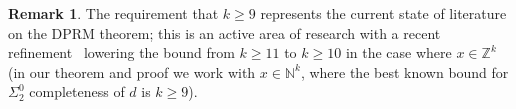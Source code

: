 \documentclass[10pt, a4paper, reqno]{amsart}
\numberwithin{equation}{section}
\renewcommand{\geq}{\geqslant}
\theoremstyle{definition}
\newtheorem{remark}[theorem]{Remark}
\theoremstyle{definition}
\begin{document}
 \begin{remark}
	The requirement that $k \geq 9$ represents the current state of literature on the DPRM theorem; this is an active area of research with a recent refinement~\cite{sun2026} lowering the bound from $k\geq11$ to $k\geq10$ in the case where $x \in \mathbb{Z}^k$ (in our theorem and proof we work with $x \in \mathbb{N}^k$, where the best known bound for $\Sigma_2^0$ completeness of $d$ is $k\geq 9$).
\end{remark}
 




\end{document}
